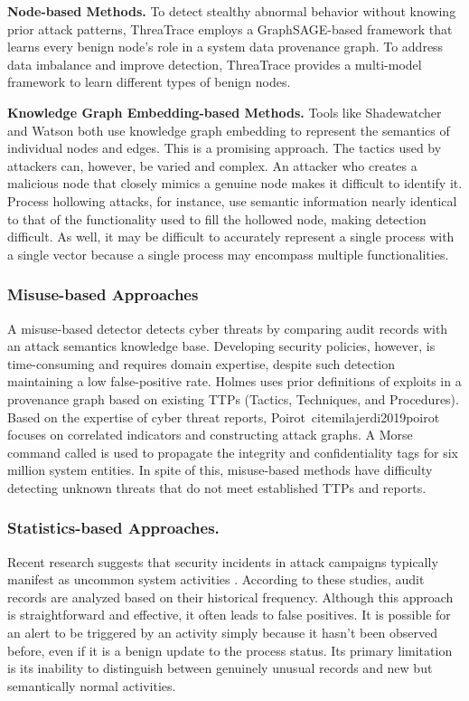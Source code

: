 \noindent
{\bf Node-based Methods.} To detect stealthy abnormal behavior without knowing prior attack patterns, ThreaTrace\cite{wang2022threatrace} employs a GraphSAGE-based framework that learns every benign node's role in a system data provenance graph. To address data imbalance and improve detection, ThreaTrace provides a multi-model framework to learn different types of benign nodes.

\noindent
{\bf Knowledge Graph Embedding-based Methods.} Tools like Shadewatcher\cite{zengy2022shadewatcher} and Watson\cite{zeng2021watson} both use knowledge graph embedding to represent the semantics of individual nodes and edges. This is a promising approach. The tactics used by attackers can, however, be varied and complex. An attacker who creates a malicious node that closely mimics a genuine node makes it difficult to identify it. Process hollowing attacks, for instance, use semantic information nearly identical to that of the functionality used to fill the hollowed node, making detection difficult. As well, it may be difficult to accurately represent a single process with a single vector because a single process may encompass multiple functionalities.

\subsubsection{Misuse-based Approaches}
A misuse-based detector detects cyber threats by comparing audit records with an attack semantics knowledge base.
Developing security policies, however, is time-consuming and requires domain expertise, despite such detection maintaining a low false-positive rate.
Holmes \cite{milajerdi2019holmes} uses prior definitions of exploits in a provenance graph based on existing TTPs (Tactics, Techniques, and Procedures).
Based on the expertise of cyber threat reports, Poirot\
cite{milajerdi2019poirot} focuses on correlated indicators and constructing attack graphs.
A Morse command called \cite{hossain2020combating} is used to propagate the integrity and confidentiality tags for six million system entities.
In spite of this, misuse-based methods have difficulty detecting unknown threats that do not meet established TTPs and reports.

\subsubsection{Statistics-based Approaches.} Recent research suggests that security incidents in attack campaigns typically manifest as uncommon system activities \cite{liu2018towards,hassan2019nodoze,hassan2020we}. According to these studies, audit records are analyzed based on their historical frequency. Although this approach is straightforward and effective, it often leads to false positives. It is possible for an alert to be triggered by an activity simply because it hasn't been observed before,  even if it is a benign update to the process status. Its primary limitation is its inability to distinguish between genuinely unusual records and new but semantically normal activities.


